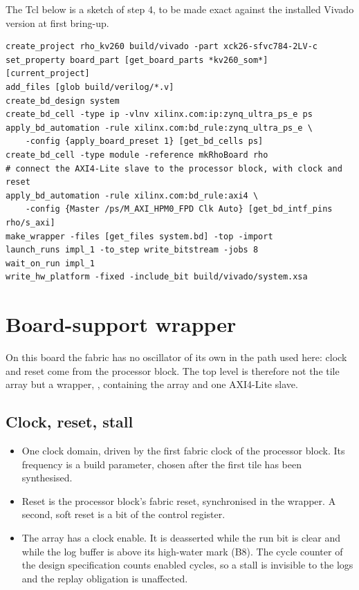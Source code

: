 The Tcl below is a sketch of step 4, to be made exact against the installed
Vivado version at first bring-up.
\begin{lstlisting}
create_project rho_kv260 build/vivado -part xck26-sfvc784-2LV-c
set_property board_part [get_board_parts *kv260_som*] [current_project]
add_files [glob build/verilog/*.v]
create_bd_design system
create_bd_cell -type ip -vlnv xilinx.com:ip:zynq_ultra_ps_e ps
apply_bd_automation -rule xilinx.com:bd_rule:zynq_ultra_ps_e \
    -config {apply_board_preset 1} [get_bd_cells ps]
create_bd_cell -type module -reference mkRhoBoard rho
# connect the AXI4-Lite slave to the processor block, with clock and reset
apply_bd_automation -rule xilinx.com:bd_rule:axi4 \
    -config {Master /ps/M_AXI_HPM0_FPD Clk Auto} [get_bd_intf_pins rho/s_axi]
make_wrapper -files [get_files system.bd] -top -import
launch_runs impl_1 -to_step write_bitstream -jobs 8
wait_on_run impl_1
write_hw_platform -fixed -include_bit build/vivado/system.xsa
\end{lstlisting}

\section{Board-support wrapper}\label{sec:wrapper}

On this board the fabric has no oscillator of its own in the path used here:
clock and reset come from the processor block. The top level is therefore
not the tile array but a wrapper, \kw{mkRhoBoard}, containing the array and
one AXI4-Lite slave.

\subsection{Clock, reset, stall}
\begin{itemize}
\item One clock domain, driven by the first fabric clock of the processor
block. Its frequency is a build parameter, chosen after the first tile has
been synthesised.
\item Reset is the processor block's fabric reset, synchronised in the
wrapper. A second, soft reset is a bit of the control register.
\item The array has a clock enable. It is deasserted while the run bit is
clear and while the log buffer is above its high-water mark (B8). The cycle
counter of the design specification counts enabled cycles, so a stall is
invisible to the logs and the replay obligation is unaffected.
\end{itemize}

